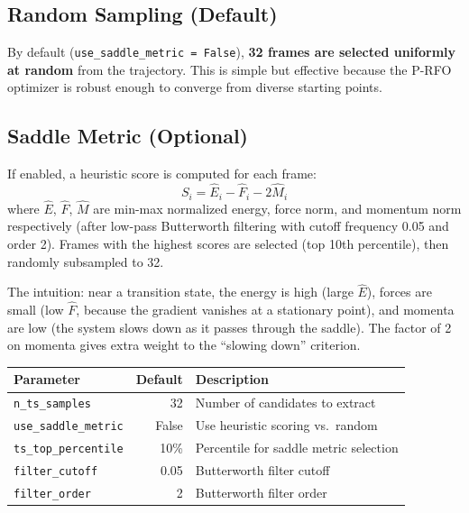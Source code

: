 \documentclass[11pt,a4paper]{article}
\begin{document}
\subsection{Random Sampling (Default)}

By default (\texttt{use\_saddle\_metric = False}), \textbf{32 frames are selected uniformly at random} from the trajectory. This is simple but effective because the P-RFO optimizer is robust enough to converge from diverse starting points.

\subsection{Saddle Metric (Optional)}

If enabled, a heuristic score is computed for each frame:
\begin{equation}
    S_i = \hat{E}_i - \hat{F}_i - 2\hat{M}_i
\end{equation}
where $\hat{E}$, $\hat{F}$, $\hat{M}$ are min-max normalized energy, force norm, and momentum norm respectively (after low-pass Butterworth filtering with cutoff frequency 0.05 and order 2). Frames with the highest scores are selected (top 10th percentile), then randomly subsampled to 32.

The intuition: near a transition state, the energy is high (large $\hat{E}$), forces are small (low $\hat{F}$, because the gradient vanishes at a stationary point), and momenta are low (the system slows down as it passes through the saddle). The factor of 2 on momenta gives extra weight to the ``slowing down'' criterion.

\begin{threshbox}
\begin{tabular}{lrl}
\toprule
Parameter & Default & Description \\
\midrule
\texttt{n\_ts\_samples} & 32 & Number of candidates to extract \\
\texttt{use\_saddle\_metric} & False & Use heuristic scoring vs.\ random \\
\texttt{ts\_top\_percentile} & 10\% & Percentile for saddle metric selection \\
\texttt{filter\_cutoff} & 0.05 & Butterworth filter cutoff \\
\texttt{filter\_order} & 2 & Butterworth filter order \\
\bottomrule
\end{tabular}
\end{threshbox}
\end{document}
